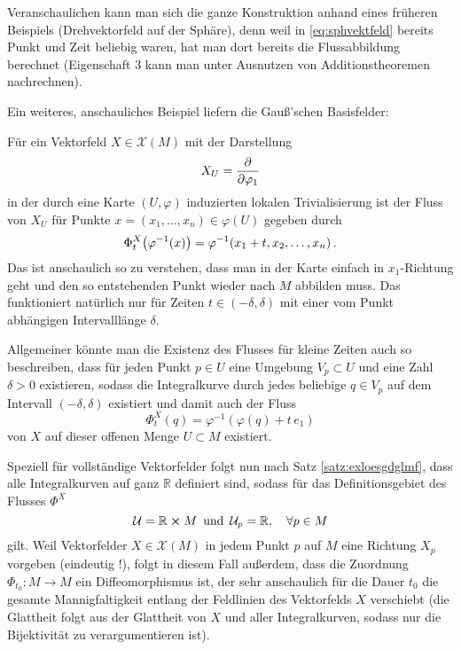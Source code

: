 \documentclass[../H_Analysis_main.tex]{subfiles}
\begin{document}

Veranschaulichen kann man sich die ganze Konstruktion anhand eines früheren Beispiels (Drehvektorfeld auf der Sphäre), denn weil in \eqref{eq:sphvektfeld} bereits Punkt und Zeit beliebig waren, hat man dort bereits die Flussabbildung berechnet (Eigenschaft 3 kann man unter Ausnutzen von Additionstheoremen nachrechnen).

Ein weiteres, anschauliches Beispiel liefern die Gauß'schen Basisfelder:
\begin{bsp}
Für ein Vektorfeld $X \in \mathcal{X}(M)$ mit der Darstellung
\begin{equation*}
X_U = \pdv{\varphi_1}
\end{equation*}
in der durch eine Karte $(U, \varphi)$ induzierten lokalen Trivialisierung ist der Fluss von $X_U$ für Punkte $x = (x_1, \dots, x_n) \in \varphi(U)$ gegeben durch
\begin{equation}
\Phi_t^X\qty(\varphi^{-1}(x)) = \varphi^{-1}(x_1 + t, x_2, \dots, x_n) \, .
\end{equation}
Das ist anschaulich so zu verstehen, dass man in der Karte einfach in $x_1$-Richtung geht und den so entstehenden Punkt wieder nach $M$ abbilden muss. Das funktioniert natürlich nur für Zeiten $t \in (-\delta, \delta)$ mit einer vom Punkt abhängigen Intervalllänge $\delta$.

Allgemeiner könnte man die Existenz des Flusses für kleine Zeiten auch so beschreiben, dass für jeden Punkt $p \in U$ eine Umgebung $V_p \subset U$ und eine Zahl $\delta > 0$ existieren, sodass die Integralkurve durch jedes beliebige $q \in V_p$ auf dem Intervall $(-\delta, \delta)$ existiert und damit auch der Fluss
\begin{equation}
\Phi_t^X(q) = \varphi^{-1}(\varphi(q) + t \, e_1)
\end{equation}
von $X$ auf dieser offenen Menge $U \subset M$ existiert.

\end{bsp}

Speziell für vollständige Vektorfelder folgt nun nach Satz \ref{satz:exloesgdglmf}, dass alle Integralkurven auf ganz $\mathbb{R}$ definiert sind, sodass für das Definitionsgebiet des Flusses $\Phi^X$
\begin{equation}
\mathcal{U} = \mathbb{R} \cross M \, \text{ und } \, \mathcal{U}_p = \mathbb{R}, \quad \forall p \in M
\end{equation}
gilt. Weil Vektorfelder $X \in \mathcal{X}(M)$ in jedem Punkt $p$ auf $M$ eine Richtung $X_p$ vorgeben (eindeutig !), folgt in diesem Fall außerdem, dass die Zuordnung $\Phi_{t_0}: M \rightarrow M$ ein Diffeomorphismus ist, der sehr anschaulich für die Dauer $t_0$ die gesamte Mannigfaltigkeit entlang der Feldlinien des Vektorfelds $X$ verschiebt (die Glattheit folgt aus der Glattheit von $X$ und aller Integralkurven, sodass nur die Bijektivität zu verargumentieren ist).
\end{document}
